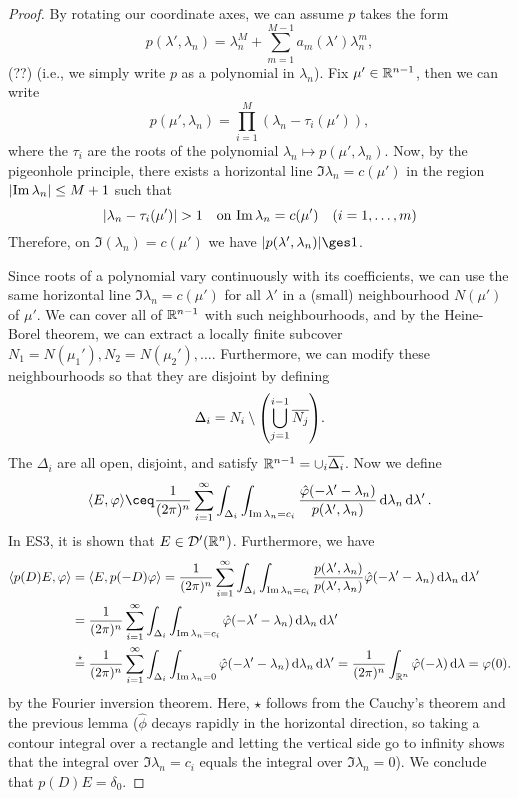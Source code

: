 \begin{proof}
	By rotating our coordinate axes, we can assume $p$ takes the form
	\[
	p(\lambda', \lambda_n) = \lambda_n^M + \sum_{m=1}^{M-1} a_m(\lambda') \lambda_n^m, 
	\]
	(??) (i.e., we simply write $p$ as a polynomial in $\lambda_n$). Fix $\mu' \in \mathbb R^{n-1}$, then we can write
	\[
	p(\mu', \lambda_n) = \prod_{i=1}^M (\lambda_n - \tau_i(\mu')), 
	\]
	where the $\tau_i$ are the roots of the polynomial $\lambda_n \mapsto p(\mu', \lambda_n)$. Now, by the pigeonhole principle, there exists a horizontal line $\Im\lambda_n = c(\mu')$ in the region $\abs{\Im\lambda_n} \leq M + 1$ such that
	\[
	\abs{\lambda_n - \tau_i(\mu')} > 1 \quad\text{on $\Im\lambda_n = c(\mu')$} \quad (i = 1, \dotsc, m)
	\]
	Therefore, on $\Im(\lambda_n) = c(\mu')$ we have $\abs{p(\lambda', \lambda_n)} \ges 1$. 
	
	Since roots of a polynomial vary continuously with its coefficients, we can use the same horizontal line $\Im\lambda_n = c(\mu')$ for all $\lambda'$ in a (small) neighbourhood $N(\mu')$ of $\mu'$. We can cover all of $\mathbb R^{n-1}$ with such neighbourhoods, and by the Heine-Borel theorem, we can extract a locally finite subcover $N_1 = N(\mu_1'), N_2 = N(\mu_2'), \dotsc$. Furthermore, we can modify these neighbourhoods so that they are disjoint by defining 
	\[
	\Delta_i = N_i \setminus \qty(\bigcup_{j=1}^{i-1} \overline{N_j}). 
	\]
	The $\Delta_i$ are all open, disjoint, and satisfy $\mathbb R^{n-1} = \cup_i \overline{\Delta_i}$.
	Now we define
	\[
	\ang{E, \phi} \ceq \frac1{(2\pi)^n} \sum_{i=1}^\infty \int_{\Delta_i} \int_{\Im\lambda_n = c_i} \frac{\hat\phi(-\lambda' - \lambda_n)}{p(\lambda', \lambda_n)} \dd{\lambda_n} \dd{\lambda'}. 
	\]
	In ES3, it is shown that $E \in \mathcal D'(\mathbb R^n)$. Furthermore, we have
	\begin{align*}
		\langle p(D)E, \varphi\rangle &= \langle E, p(-D)\varphi\rangle = \frac1{(2\pi)^n} \sum_{i=1}^\infty \int_{\Delta_i} \int_{\Im\lambda_n = c_i} \frac{p(\lambda', \lambda_n)}{p(\lambda', \lambda_n)} \hat{\varphi}(-\lambda' - \lambda_n) \dd{\lambda_n} \dd{\lambda'} \\
		&= \frac1{(2\pi)^n} \sum_{i=1}^\infty \int_{\Delta_i} \int_{\Im\lambda_n = c_i}  \hat{\varphi}(-\lambda' - \lambda_n) \dd{\lambda_n} \dd{\lambda'}  \\
		&\overset\star= \frac1{(2\pi)^n} \sum_{i=1}^\infty \int_{\Delta_i} \int_{\Im\lambda_n = 0}  \hat{\varphi}(-\lambda' - \lambda_n) \dd{\lambda_n} \dd{\lambda'} = \frac1{(2\pi)^n} \int_{\mathbb R^n} \hat{\varphi}(-\lambda) \dd{\lambda} = \varphi(0).
	\end{align*} 
by the Fourier inversion theorem. Here, $\star$ follows from the Cauchy's theorem and the previous lemma ($\hat\phi$ decays rapidly in the horizontal direction, so taking a contour integral over a rectangle and letting the vertical side go to infinity shows that the integral over $\Im \lambda_n = c_i$ equals the integral over $\Im\lambda_n = 0$). We conclude that $p(D)E = \delta_0$. 
\end{proof}

